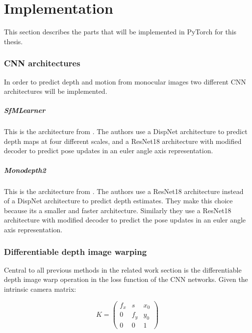 \chapter{Implementation}\label{cha:implementation}

This section describes the parts that will be implemented in PyTorch for this thesis.







\iffalse

\subsection{CNN architectures}

In order to predict depth and motion from monocular images two different CNN architectures will be implemented.

\paragraph{SfMLearner} This is the architecture from \cite{sfmlearner}. The authors use a DispNet\cite{dispnet} architecture to predict depth maps at four different scales, and a ResNet18\cite{resnet} architecture with modified decoder to predict pose updates in an euler angle axis representation.

\paragraph{Monodepth2} This is the architecture from \cite{monodepth2}. The authors use a ResNet18 architecture instead of a DispNet architecture to predict depth estimates. They make this choice because its a smaller and faster architecture. Similarly they use a ResNet18 architecture with modified decoder to predict the pose updates in an euler angle axis representation.

\subsection{Differentiable depth image warping}
\label{sec:diffwarp}

Central to all previous methods in the related work section is the differentiable depth image warp operation in the loss function of the CNN networks. Given the intrinsic camera matrix:

\[
K = 
\begin{pmatrix}
f_x & s & x_0 \\
0 & f_y & y_0 \\
0 & 0   & 1
\end{pmatrix}
\]

